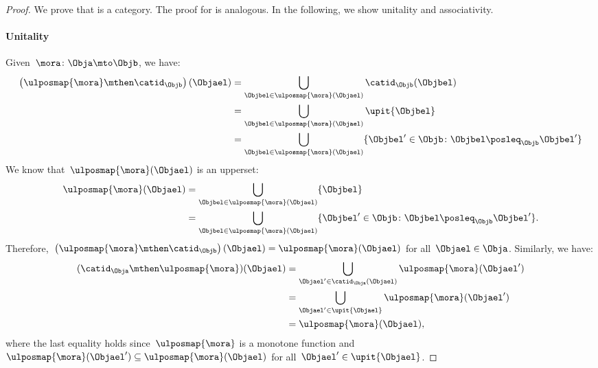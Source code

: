 \begin{proof}
We prove that \UPos is a category. The proof for \LPos is analogous.
In the following, we show unitality and associativity.
\paragraph*{Unitality} Given~$\mora\colon \Obja \mto \Objb$, we have:
\begin{equation*}
    \begin{aligned}
    \left( \ulposmap{\mora} \mthen \catid_\Objb\right)(\Objael)&=\bigcup_{\Objbel\in \ulposmap{\mora}(\Objael)}\catid_\Objb(\Objbel)\\
    &=\bigcup_{\Objbel\in \ulposmap{\mora}(\Objael)}\upit\{\Objbel\}\\
    &=\bigcup_{\Objbel\in \ulposmap{\mora}(\Objael)}\{\Objbel'\in \Objb \colon \Objbel\posleq_\Objb \Objbel' \}
    \end{aligned}
\end{equation*}
We know that~$\ulposmap{\mora}(\Objael)$ is an upperset:
\begin{equation*}
    \begin{aligned}
    \ulposmap{\mora}(\Objael)&=\bigcup_{\Objbel\in \ulposmap{\mora}(\Objael)}\{\Objbel\}\\
    &=\bigcup_{\Objbel\in \ulposmap{\mora}(\Objael)}\{ \Objbel'\in \Objb \colon \Objbel\posleq_\Objb \Objbel'\}.
    \end{aligned}
\end{equation*}
Therefore,~$\left( \ulposmap{\mora} \mthen \catid_\Objb\right)(\Objael)=\ulposmap{\mora}(\Objael)$ for all~$\Objael\in \Obja$.
Similarly, we have:
\begin{equation*}
    \begin{aligned}
    (\catid_\Obja \mthen \ulposmap{\mora})(\Objael)&=\bigcup_{\Objael'\in \catid_\Obja(\Objael)}\ulposmap{\mora}(\Objael')\\
    &=\bigcup_{\Objael'\in \upit \{\Objael\}}\ulposmap{\mora}(\Objael')\\
    &=\ulposmap{\mora}(\Objael),
    \end{aligned}
\end{equation*}
where the last equality holds since~$\ulposmap{\mora}$ is a monotone function and~$\ulposmap{\mora}(\Objael')\subseteq \ulposmap{\mora}(\Objael)$ for all~$\Objael'\in \upit \{\Objael\}$.

\end{proof}
